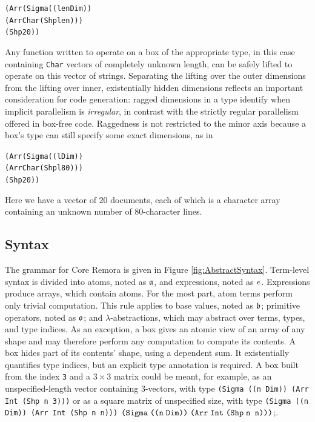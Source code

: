\begin{alltt}
(Arr (Sigma ((len Dim))
       (Arr Char (Shp len)))
     (Shp 20))
\end{alltt}
Any function written to operate on a box of the appropriate type,
in this case containing {\tt Char} vectors of completely unknown length,
can be safely lifted to operate on this vector of strings.
Separating the lifting over the outer dimensions
from the lifting over inner, existentially hidden dimensions
reflects an important consideration for code generation:
ragged dimensions in a type identify when implicit parallelism is \emph{irregular},
in contrast with the strictly regular parallelism offered in box-free code.
Raggedness is not restricted to the minor axis
because a box's type can still specify some exact dimensions,
as in
\begin{alltt}
(Arr (Sigma ((l Dim))
        (Arr Char (Shp l 80)))
     (Shp 20))
\end{alltt}
Here we have a vector of 20 documents,
each of which is a character array
containing an unknown number of 80-character lines.

\subsection{Syntax}
\FigAbstractSyntax
The grammar for Core Remora is given in Figure \ref{fig:AbstractSyntax}.
Term-level syntax is divided into atoms,
noted as $\mathfrak{a}$,
and expressions,
noted as $\mathit{e}$.
Expressions produce arrays,
which contain atoms.
For the most part, atom terms perform only trivial computation.
This rule applies to base values,
noted as $\mathfrak{b}$;
primitive operators,
noted as $\mathfrak{o}$;
and $\lambda$-abstractions,
which may abstract over terms, types, and type indices.
As an exception,
a box gives an atomic view of an array of any shape
and may therefore perform any computation to compute its contents.
A box hides part of its contents' shape,
using a dependent sum.
It existentially quantifies type indices,
but an explicit type annotation is required.
A box built from the index {\tt 3} and a $3\times3$ matrix
could be meant, for example,
as an unspecified-length vector containing 3-vectors,
with type
{\tt (Sigma ((n Dim)) (Arr Int (Shp n 3)))}
or as a square matrix of unspecified size,
with type
{\tt (Sigma ((n Dim)) (Arr Int (Shp n n)))}
$\typedsum
{\notevar{\text{\tt n}}{\sortdim}}
{\typearray{\text{\tt Int}}{\idxshape{\text{\tt n n}}}}$;.

